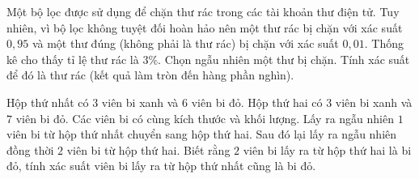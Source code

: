 
\begin{bt}%
	Một bộ lọc được sử dụng để chặn thư rác trong các tài khoản thư điện tử. Tuy nhiên, vì bộ lọc không tuyệt đối hoàn hảo nên một thư rác bị chặn với xác suất $0{,}95$ và một thư đúng (không phải là thư rác) bị  chặn với xác suất $0{,}01$. Thống kê cho thấy tỉ lệ thư rác là $3\%$. Chọn ngẫu nhiên một thư bị chặn. Tính xác suất để đó là thư rác (kết quả làm tròn đến hàng phần nghìn).
\end{bt}

\begin{bt}%
	Hộp thứ nhất có $3$ viên bi xanh và $6$ viên bi đỏ. Hộp thứ hai có $3$ viên bi xanh và $7$ viên bi đỏ. Các viên bi có cùng kích thước và khối lượng.  Lấy ra ngẫu nhiên $1$ viên bi từ hộp thứ nhất chuyển sang hộp thứ hai. Sau đó lại lấy ra ngẫu nhiên đồng thời $2$ viên bi từ hộp thứ hai. Biết rằng $2$ viên bi lấy ra từ hộp thứ hai là bi đỏ, tính xác suất viên bi lấy ra từ hộp thứ nhất cũng là bi đỏ.
\end{bt}

